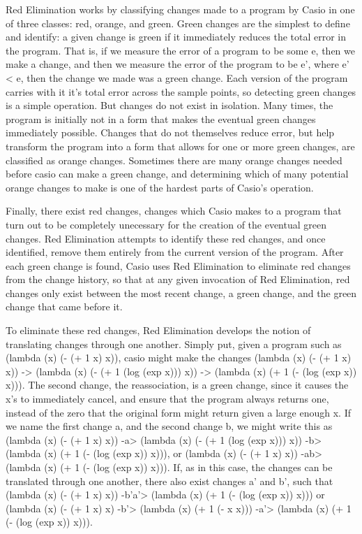 \documentclass{article}
\begin{document}
Red Elimination works by classifying changes made to a program by Casio in one of three classes: 
red, orange, and green. 
Green changes are the simplest to define and identify: 
a given change is green if it immediately reduces the total error in the program. 
That is, if we measure the error of a program to be some e, 
then we make a change, 
and then we measure the error of the program to be e', 
where e' < e, 
then the change we made was a green change. 
Each version of the program carries with it 
it's total error across the sample points, 
so detecting green changes is a simple operation. 
But changes do not exist in isolation. 
Many times, the program is initially not in a form 
that makes the eventual green changes immediately possible. 
Changes that do not themselves reduce error, 
but help transform the program into a form 
that allows for one or more green changes, 
are classified as orange changes. 
Sometimes there are many orange changes needed 
before casio can make a green change, 
and determining which of many potential orange changes 
to make is one of the hardest parts of Casio's operation.

Finally, there exist red changes, 
changes which Casio makes to a program 
that turn out to be completely unecessary 
for the creation of the eventual green changes. 
Red Elimination attempts to identify these red changes, 
and once identified, 
remove them entirely from the current version of the program. 
After each green change is found, 
Casio uses Red Elimination to eliminate red changes from the change history, 
so that at any given invocation of Red Elimination, 
red changes only exist between the most recent change, 
a green change, 
and the green change that came before it.

To eliminate these red changes, 
Red Elimination develops the notion of translating changes through one another. 
Simply put, 
given a program such as (lambda (x) (- (+ 1 x) x)), 
casio might make the changes (lambda (x) (- (+ 1 x) x)) -> 
(lambda (x) (- (+ 1 (log (exp x))) x)) -> 
(lambda (x) (+ 1 (- (log (exp x)) x))). 
The second change, 
the reassociation, is a green change, 
since it causes the x's to immediately cancel, 
and ensure that the program always returns one, 
instead of the zero that the original form might return 
given a large enough x. 
If we name the first change a, 
and the second change b, 
we might write this as (lambda (x) (- (+ 1 x) x)) -a> 
(lambda (x) (- (+ 1 (log (exp x))) x)) -b> 
(lambda (x) (+ 1 (- (log (exp x)) x))), 
or (lambda (x) (- (+ 1 x) x)) -ab> 
(lambda (x) (+ 1 (- (log (exp x)) x))). 
If, as in this case, 
the changes can be translated through one another, 
there also exist changes a' and b', 
such that (lambda (x) (- (+ 1 x) x)) -b'a'> 
(lambda (x) (+ 1 (- (log (exp x)) x))) 
or (lambda (x) (- (+ 1 x) x) -b'> 
(lambda (x) (+ 1 (- x x))) -a'> 
(lambda (x) (+ 1 (- (log (exp x)) x))).
\end{document}
